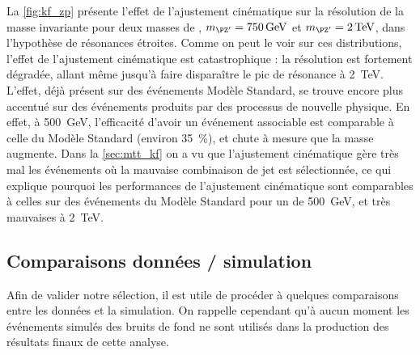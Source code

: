 La \cref{fig:kf_zp} présente l'effet de l'ajustement cinématique sur la résolution de la masse invariante pour deux masses de \zprime, $\mzp = \SI{750}{\GeV}$ et $\mzp = \SI{2}{\TeV}$, dans l'hypothèse de résonances étroites. Comme on peut le voir sur ces distributions, l'effet de l'ajustement cinématique est catastrophique : la résolution est fortement dégradée, allant même jusqu'à faire disparaître le pic de résonance à \SI{2}{\TeV}. L'effet, déjà présent sur des événements \ttbar Modèle Standard, se trouve encore plus accentué sur des événements \ttbar produits par des processus de nouvelle physique. En effet, à \SI{500}{\GeV}, l'efficacité d'avoir un événement associable est comparable à celle du Modèle Standard (environ \SI{35}{\percent}), et chute à mesure que la masse augmente. Dans la \cref{sec:mtt_kf} on a vu que l'ajustement cinématique gère très mal les événements où la mauvaise combinaison de jet est sélectionnée, ce qui explique pourquoi les performances de l'ajustement cinématique sont comparables à celles sur des événements \ttbar du Modèle Standard pour un \zprime de \SI{500}{\GeV}, et très mauvaises à \SI{2}{\TeV}.

\subsection{Comparaisons données / simulation}

Afin de valider notre sélection, il est utile de procéder à quelques comparaisons entre les données et la simulation. On rappelle cependant qu'à aucun moment les événements simulés des bruits de fond ne sont utilisés dans la production des résultats finaux de cette analyse.

\medskip

